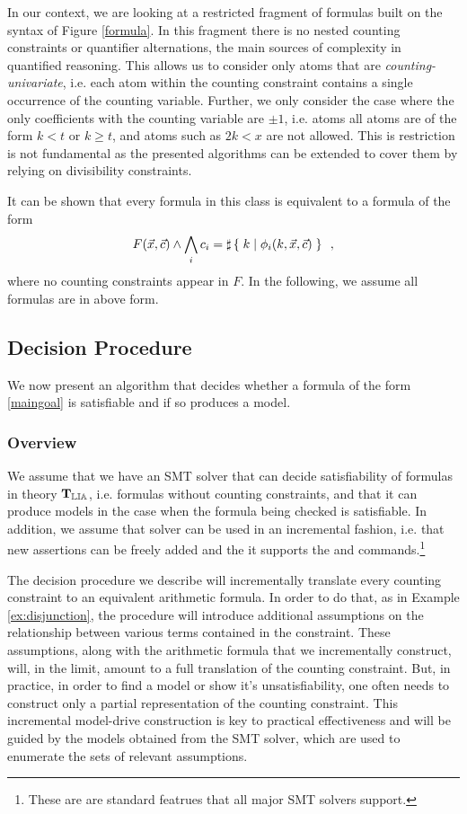 In our context, we are looking at a restricted fragment of formulas
built on the syntax of Figure \ref{formula}. In this fragment there is
no nested counting constraints or quantifier alternations, the main
sources of complexity in quantified reasoning. This allows us to
consider only atoms that are \emph{counting-univariate}, i.e. each
atom within the counting constraint contains a single occurrence of
the counting variable. Further, we only consider the case where the
only coefficients with the counting variable are $\pm 1$, i.e. atoms
all atoms are of the form $k < t$ or $k \geq t$, and atoms such as $2k <
x$ are not allowed. This is restriction is not fundamental as the
presented algorithms can be extended to cover them by relying on
divisibility constraints.

It can be shown that every formula in this class is equivalent to a
formula of the form
\begin{equation}
F(\vec{x}, \vec{c}) \land \bigwedge_i c_i = \sharp\left\lbrace\;k\;|\;\phi_i(k, \vec{x}, \vec{c})\;\right\rbrace\enspace,
\label{maingoal}
\end{equation}
where no counting constraints appear in $F$. In the following, we
assume all formulas are in above form.

\subsection{Decision Procedure}

We now present an algorithm that decides whether a formula of the form
\ref{maingoal} is satisfiable and if so produces a model.

\subsubsection{Overview}

We assume that we have an SMT solver \solver that can decide
satisfiability of formulas in theory $\operatorname{\mathbf{T}_\mathbb{LIA}}$, i.e. formulas without
counting constraints, and that it can produce models in the case when
the formula being checked is satisfiable. In addition, we assume that
solver \solver can be used in an incremental fashion, i.e. that new
assertions can be freely added and the it supports the \push and \pop
commands.\footnote{These are are standard featrues that all major SMT
solvers support.}

The decision procedure we describe will incrementally translate every
counting constraint to an equivalent arithmetic formula. In order to
do that, as in Example \ref{ex:disjunction}, the procedure will
introduce additional assumptions on the relationship between various
terms contained in the constraint. These assumptions, along with the
arithmetic formula that we incrementally construct, will, in the
limit, amount to a full translation of the counting constraint. But,
in practice, in order to find a model or show it's unsatisfiability,
one often needs to construct only a partial representation of the
counting constraint. This incremental model-drive construction is key
to practical effectiveness and will be guided by the models obtained
from the SMT solver, which are used to enumerate the sets of relevant
assumptions.

